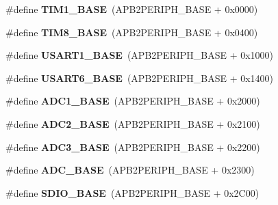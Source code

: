 \begin{DoxyCompactItemize}
\#define {\bfseries T\+I\+M1\+\_\+\+B\+A\+SE}~(A\+P\+B2\+P\+E\+R\+I\+P\+H\+\_\+\+B\+A\+SE + 0x0000)
\item 
\mbox{\label{group___peripheral__memory__map_ga5b72f698b7a048a6f9fcfe2efe5bc1db}} 
\#define {\bfseries T\+I\+M8\+\_\+\+B\+A\+SE}~(A\+P\+B2\+P\+E\+R\+I\+P\+H\+\_\+\+B\+A\+SE + 0x0400)
\item 
\mbox{\label{group___peripheral__memory__map_ga86162ab3f740db9026c1320d46938b4d}} 
\#define {\bfseries U\+S\+A\+R\+T1\+\_\+\+B\+A\+SE}~(A\+P\+B2\+P\+E\+R\+I\+P\+H\+\_\+\+B\+A\+SE + 0x1000)
\item 
\mbox{\label{group___peripheral__memory__map_gade4d3907fd0387ee832f426f52d568bb}} 
\#define {\bfseries U\+S\+A\+R\+T6\+\_\+\+B\+A\+SE}~(A\+P\+B2\+P\+E\+R\+I\+P\+H\+\_\+\+B\+A\+SE + 0x1400)
\item 
\mbox{\label{group___peripheral__memory__map_ga695c9a2f892363a1c942405c8d351b91}} 
\#define {\bfseries A\+D\+C1\+\_\+\+B\+A\+SE}~(A\+P\+B2\+P\+E\+R\+I\+P\+H\+\_\+\+B\+A\+SE + 0x2000)
\item 
\mbox{\label{group___peripheral__memory__map_ga6544abc57f9759f610eee09a02442ae6}} 
\#define {\bfseries A\+D\+C2\+\_\+\+B\+A\+SE}~(A\+P\+B2\+P\+E\+R\+I\+P\+H\+\_\+\+B\+A\+SE + 0x2100)
\item 
\mbox{\label{group___peripheral__memory__map_gaca766f86c8e0b00a8e2b0224dcbb4c82}} 
\#define {\bfseries A\+D\+C3\+\_\+\+B\+A\+SE}~(A\+P\+B2\+P\+E\+R\+I\+P\+H\+\_\+\+B\+A\+SE + 0x2200)
\item 
\mbox{\label{group___peripheral__memory__map_gad06cb9e5985bd216a376f26f22303cd6}} 
\#define {\bfseries A\+D\+C\+\_\+\+B\+A\+SE}~(A\+P\+B2\+P\+E\+R\+I\+P\+H\+\_\+\+B\+A\+SE + 0x2300)
\item 
\mbox{\label{group___peripheral__memory__map_ga95dd0abbc6767893b4b02935fa846f52}} 
\#define {\bfseries S\+D\+I\+O\+\_\+\+B\+A\+SE}~(A\+P\+B2\+P\+E\+R\+I\+P\+H\+\_\+\+B\+A\+SE + 0x2\+C00)
\item 

\end{DoxyCompactItemize}

